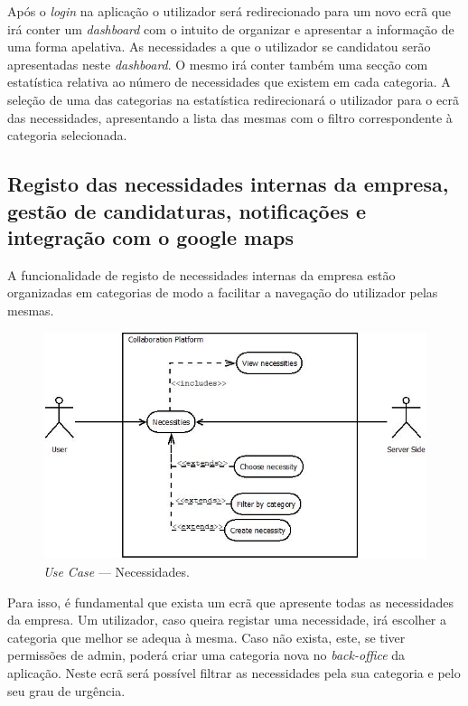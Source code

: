 Após o \textit{login} na aplicação o utilizador será redirecionado para um novo ecrã que irá conter um \textit{dashboard} com o intuito de organizar e 
apresentar a informação de uma forma apelativa. As necessidades a que o utilizador se candidatou serão apresentadas neste \textit{dashboard}. 
O mesmo irá conter também uma secção com estatística relativa ao número de necessidades que existem em cada categoria. 
A seleção de uma das categorias na estatística redirecionará o utilizador para o ecrã das necessidades, 
apresentando a lista das mesmas com o filtro correspondente à categoria selecionada. 

\subsection{Registo das necessidades internas da empresa, gestão de candidaturas, notificações e integração com o google maps}\label{subsec:necessitiesCandidatesNotificationsGoogleMaps}

A funcionalidade de registo de necessidades internas da empresa estão organizadas em categorias de modo a facilitar a navegação do utilizador pelas mesmas.

\begin{figure}[H]
    \centering
    \includegraphics[scale=0.6]{figures/Necessities.jpeg}
    \caption{\textit{Use Case} --- Necessidades.}\label{fig:uc:necessities}
\end{figure}

Para isso, é fundamental que exista um ecrã que apresente todas as necessidades da empresa. 
Um utilizador, caso queira registar uma necessidade, irá escolher a categoria que melhor se adequa à mesma. 
Caso não exista, este, se tiver permissões de admin, poderá criar uma categoria nova no \textit{back-office} da aplicação. 
Neste ecrã será possível filtrar as necessidades pela sua categoria e pelo seu grau de urgência.

